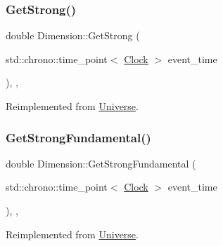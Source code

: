 \mbox{\label{classDimension_ae36aadad4ae84735a5ff73bff4eb97b1}} 
\subsubsection{\texorpdfstring{Get\+Strong()}{GetStrong()}}
{\footnotesize\ttfamily double Dimension\+::\+Get\+Strong (\begin{DoxyParamCaption}\item[{std\+::chrono\+::time\+\_\+point$<$ \mbox{\hyperlink{universe_8h_a0ef8d951d1ca5ab3cfaf7ab4c7a6fd80}{Clock}} $>$}]{event\+\_\+time }\end{DoxyParamCaption})\hspace{0.3cm}{\ttfamily [inline]}, {\ttfamily [final]}, {\ttfamily [virtual]}}



Reimplemented from \mbox{\hyperlink{classUniverse_acb453ce71da418c5b5617fecede9571b}{Universe}}.

\mbox{\label{classDimension_ad0d067d7f9dc4841b0ad280979ebe7af}} 
\subsubsection{\texorpdfstring{Get\+Strong\+Fundamental()}{GetStrongFundamental()}}
{\footnotesize\ttfamily double Dimension\+::\+Get\+Strong\+Fundamental (\begin{DoxyParamCaption}\item[{std\+::chrono\+::time\+\_\+point$<$ \mbox{\hyperlink{universe_8h_a0ef8d951d1ca5ab3cfaf7ab4c7a6fd80}{Clock}} $>$}]{event\+\_\+time }\end{DoxyParamCaption})\hspace{0.3cm}{\ttfamily [inline]}, {\ttfamily [final]}, {\ttfamily [virtual]}}



Reimplemented from \mbox{\hyperlink{classUniverse_ab44daccba01ee7e3cf9b50bba83dd19e}{Universe}}.

\mbox{\label{classDimension_aeee6025f17d9cd1bf7f324d715a30691}} 
